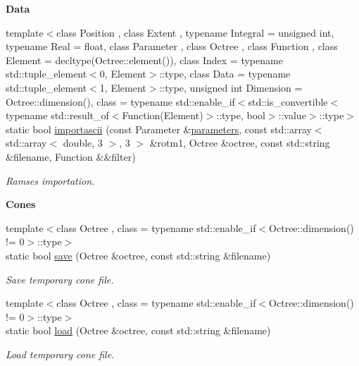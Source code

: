 \begin{Indent}{\bf Data}
\begin{DoxyCompactItemize}
{\footnotesize template$<$class Position , class Extent , typename Integral  = unsigned int, typename Real  = float, class Parameter , class Octree , class Function , class Element  = decltype(\-Octree\-::element()), class Index  = typename std\-::tuple\-\_\-element$<$0, Element$>$\-::type, class Data  = typename std\-::tuple\-\_\-element$<$1, Element$>$\-::type, unsigned int Dimension = Octree\-::dimension(), class  = typename std\-::enable\-\_\-if$<$std\-::is\-\_\-convertible$<$typename std\-::result\-\_\-of$<$\-Function(\-Element)$>$\-::type, bool$>$\-::value$>$\-::type$>$ }\\static bool \hyperlink{exceptionInput_abce9dd58852a179e153752fe605d9b1b}{importascii} (const Parameter \&\hyperlink{rays_8h_ae1bc8b0b8c8b9f8e4cc61a5cc7c4ce9e}{parameters}, const std\-::array$<$ std\-::array$<$ double, 3 $>$, 3 $>$ \&rotm1, Octree \&octree, const std\-::string \&filename, Function \&\&filter)
\begin{DoxyCompactList}\small\item\em Ramses importation. \end{DoxyCompactList}\end{DoxyCompactItemize}
\end{Indent}
\begin{Indent}{\bf Cones}\par
\begin{DoxyCompactItemize}
\item 
{\footnotesize template$<$class Octree , class  = typename std\-::enable\-\_\-if$<$\-Octree\-::dimension() != 0$>$\-::type$>$ }\\static bool \hyperlink{exceptionInput_abad0f0cf2cb2bd1b0365e294da2161a9}{save} (Octree \&octree, const std\-::string \&filename)
\begin{DoxyCompactList}\small\item\em Save temporary cone file. \end{DoxyCompactList}\item 
{\footnotesize template$<$class Octree , class  = typename std\-::enable\-\_\-if$<$\-Octree\-::dimension() != 0$>$\-::type$>$ }\\static bool \hyperlink{exceptionInput_a329ca4957faa31f920b84c82ac9a2a6d}{load} (Octree \&octree, const std\-::string \&filename)
\begin{DoxyCompactList}\small\item\em Load temporary cone file. \end{DoxyCompactList}\end{DoxyCompactItemize}
\end{Indent}
